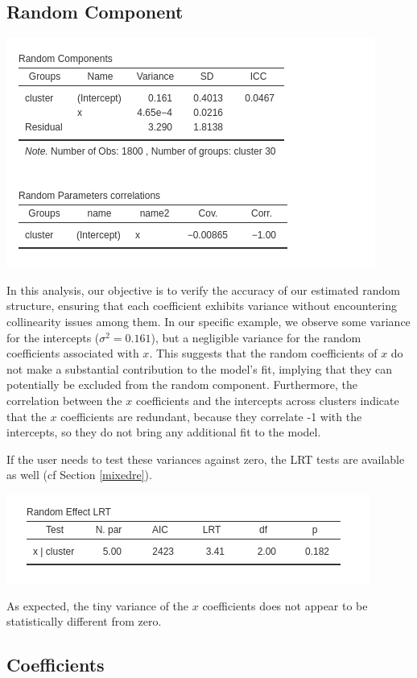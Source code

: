 \documentclass[
]{book}
\begin{document}
\hypertarget{random-component}{%
\subsection{Random Component}\label{random-component}}

\includegraphics[width=0.8\linewidth]{bookletpics/5_logistic_output3}

In this analysis, our objective is to verify the accuracy of our estimated random structure, ensuring that each coefficient exhibits variance without encountering collinearity issues among them. In our specific example, we observe some variance for the intercepts (\(\sigma^2 = 0.161\)), but a negligible variance for the random coefficients associated with \(x\). This suggests that the random coefficients of \(x\) do not make a substantial contribution to the model's fit, implying that they can potentially be excluded from the random component. Furthermore, the correlation between the \(x\) coefficients and the intercepts across clusters indicate that the \(x\) coefficients are redundant, because they correlate -1 with the intercepts, so they do not bring any additional fit to the model.

If the user needs to test these variances against zero, the LRT tests are available as well (cf Section \ref{mixedre}).

\includegraphics[width=0.7\linewidth]{bookletpics/5_logistic_output5}

As expected, the tiny variance of the \(x\) coefficients does not appear to be statistically different from zero.

\hypertarget{coefficients-4}{%
\subsection{Coefficients}\label{coefficients-4}}
\end{document}
